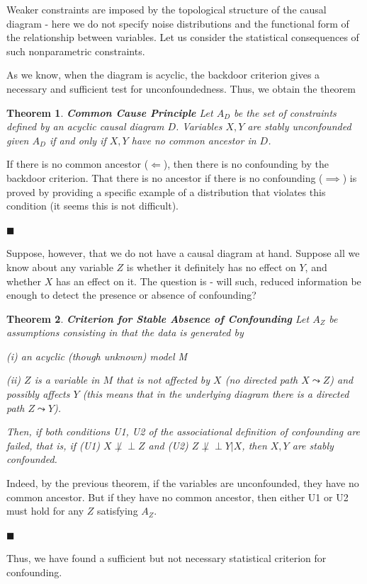 \documentclass[fleqn]{article}
\newcommand{\independent}{\perp \!\!\! \perp}
\newtheorem{theorem}{Theorem}
\numberwithin{equation}{section}
\numberwithin{theorem}{section}
\numberwithin{figure}{section}
\numberwithin{lemma}{section}
\numberwithin{corollary}{section}
\begin{document}
Weaker constraints are imposed by the topological structure of the causal diagram - here we do not specify noise distributions and the functional form of the relationship between variables. Let us consider the statistical consequences of such nonparametric constraints.

As we know, when the diagram is acyclic, the backdoor criterion gives a necessary and sufficient test for unconfoundedness. Thus, we obtain the theorem

\begin{theorem}
	\textbf{Common Cause Principle} Let $A_D$ be the set of constraints defined by an acyclic causal diagram $D$. Variables $X,Y$ are stably unconfounded given $A_D$ if and only if $X, Y$ have no common ancestor in $D$.
\end{theorem}

If there is no common ancestor ($\Leftarrow$), then there is no confounding by the backdoor criterion. That there is no ancestor if there is no confounding ($\implies$) is proved by providing a specific example of a distribution that violates this condition (it seems this is not difficult).

$\blacksquare$

Suppose, however, that we do not have a causal diagram at hand. Suppose all we know about any variable $Z$ is whether it definitely has no effect on $Y$, and whether $X$ has an effect on it. The question is - will such, reduced information be enough to detect the presence or absence of confounding?

\begin{theorem}
	\textbf{Criterion for Stable Absence of Confounding} Let $A_Z$ be assumptions consisting in that the data is generated by
	
	(i) an acyclic (though unknown) model M
	
	(ii) $Z$ is a variable in $M$ that is not affected by $X$ (no directed path $X \leadsto Z$) and possibly affects $Y$ (this means that in the underlying diagram there is a directed path $Z \leadsto Y$). 
	
	Then, if both conditions U1, U2 of the associational definition of confounding are failed, that is, if (U1) $X \not \independent Z$ and (U2) $Z \not \independent Y | X$, then $X, Y$ are stably confounded.
\end{theorem}

Indeed, by the previous theorem, if the variables are unconfounded, they have no common ancestor. But if they have no common ancestor, then either U1 or U2 must hold for any $Z$ satisfying $A_Z$.

$\blacksquare$

Thus, we have found a sufficient but not necessary statistical criterion for confounding.
	
\end{document}
